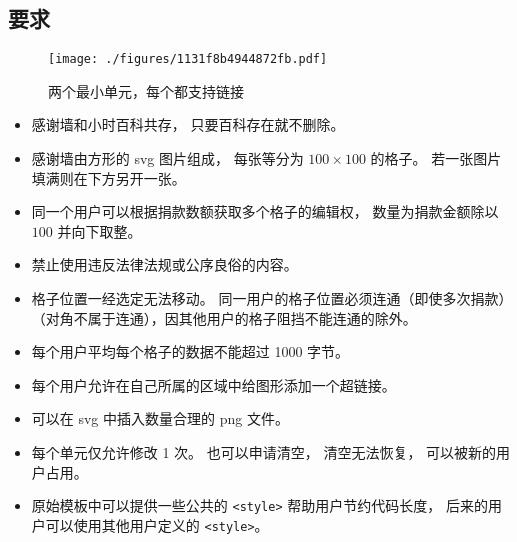 
\subsection{要求}

\begin{figure}[ht]
\centering
\texttt{[image: ./figures/1131f8b4944872fb.pdf]}
\caption{两个最小单元，每个都支持链接} \label{fig_thanks_1}
\end{figure}

\begin{itemize}
\item 感谢墙和小时百科共存， 只要百科存在就不删除。
\item 感谢墙由方形的 svg 图片组成， 每张等分为 $100\times 100$ 的格子。 若一张图片填满则在下方另开一张。
\item 同一个用户可以根据捐款数额获取多个格子的编辑权， 数量为捐款金额除以 $100$ 并向下取整。
\item 禁止使用违反法律法规或公序良俗的内容。
\item 格子位置一经选定无法移动。 同一用户的格子位置必须连通（即使多次捐款）（对角不属于连通），因其他用户的格子阻挡不能连通的除外。
\item 每个用户平均每个格子的数据不能超过 1000 字节。
\item 每个用户允许在自己所属的区域中给图形添加一个超链接。
\item 可以在 svg 中插入数量合理的 png 文件。
\item 每个单元仅允许修改 1 次。 也可以申请清空， 清空无法恢复， 可以被新的用户占用。
\item 原始模板中可以提供一些公共的 \verb`<style>` 帮助用户节约代码长度， 后来的用户可以使用其他用户定义的 \verb`<style>`。
\end{itemize}

